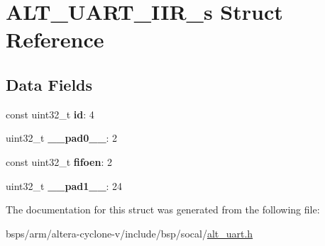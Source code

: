 \hypertarget{structALT__UART__IIR__s}{}\section{A\+L\+T\+\_\+\+U\+A\+R\+T\+\_\+\+I\+I\+R\+\_\+s Struct Reference}
\label{structALT__UART__IIR__s}
\subsection*{Data Fields}
\begin{DoxyCompactItemize}
\item 
\mbox{\label{structALT__UART__IIR__s_ac41745489fef61e4d3e17d81996b2383}} 
const uint32\+\_\+t {\bfseries id}\+: 4
\item 
\mbox{\label{structALT__UART__IIR__s_a0f6d17c41315151e77852d01cb2ad504}} 
uint32\+\_\+t {\bfseries \+\_\+\+\_\+pad0\+\_\+\+\_\+}\+: 2
\item 
\mbox{\label{structALT__UART__IIR__s_a1701396fd3fc8ff94028a27464274f60}} 
const uint32\+\_\+t {\bfseries fifoen}\+: 2
\item 
\mbox{\label{structALT__UART__IIR__s_aee01081675c63a011f684723e6dd4f0c}} 
uint32\+\_\+t {\bfseries \+\_\+\+\_\+pad1\+\_\+\+\_\+}\+: 24
\end{DoxyCompactItemize}


The documentation for this struct was generated from the following file\+:\begin{DoxyCompactItemize}
\item 
bsps/arm/altera-\/cyclone-\/v/include/bsp/socal/\mbox{\hyperlink{alt__uart_8h}{alt\+\_\+uart.\+h}}\end{DoxyCompactItemize}
